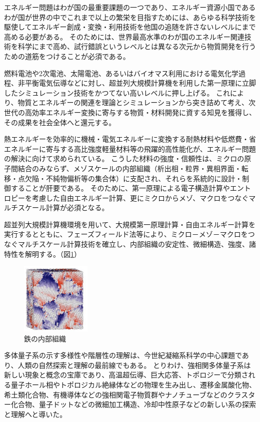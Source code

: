 エネルギー問題はわが国の最重要課題の一つであり、エネルギー資源小国であるわが国が世界の中でこれまで以上の繁栄を目指すためには、あらゆる科学技術を駆使してエネルギー創成・変換・利用技術を他国の追随を許さないレベルにまで高める必要がある。
そのためには、世界最高水準のわが国のエネルギー関連技術を科学にまで高め、試行錯誤というレベルとは異なる次元から物質開発を行うための道筋をつけることが必須である。

燃料電池や2次電池、太陽電池、あるいはバイオマス利用における電気化学過程、非平衡電気伝導などに対し、超並列大規模計算機を利用した第一原理に立脚したシミュレーション技術をかつてない高いレベルに押し上げる。
これにより、物質とエネルギーの関連を理論とシミュレーションから突き詰めて考え、次世代の高効率エネルギー変換に寄与する物質・材料開発に資する知見を獲得し、その成果を社会全体へと還元する。

熱エネルギーを効率的に機械・電気エネルギーに変換する耐熱材料や低燃費・省エネルギーに寄与する高比強度軽量材料等の飛躍的高性能化が、エネルギー問題の解決に向けて求められている。
こうした材料の強度・信頼性は、ミクロの原子間結合のみならず、メゾスケールの内部組織（析出相・粒界・異相界面・転移・点欠陥・不純物偏析等の集合体）に支配され、それらを系統的に設計・制御することが肝要である。
そのために、第一原理による電子構造計算やエントロピーを考慮した自由エネルギー計算、更にミクロからメゾ、マクロをつなぐマルチスケール計算が必須となる。

超並列大規模計算機環境を用いて、大規模第一原理計算・自由エネルギー計算を実行するとともに、フェーズフィールド法等により、ミクロ－メゾ－マクロをつなぐマルチスケール計算技術を確立し、内部組織の安定性、微細構造、強度、諸特性を解明する。（図\ref{fig:4-2_1}）

\begin{figure}[H]
  \centering
  \includegraphics[width=0.3\textwidth]{figs/4-2_1.pdf}
  \caption{鉄の内部組織}
  \label{fig:4-2_1}
\end{figure}


多体量子系の示す多様性や階層性の理解は、今世紀凝縮系科学の中心課題であり、人類の自然探索と理解の最前線でもある。
とりわけ、強相関多体量子系は新しい現象と概念の宝庫であり、高温超伝導、巨大応答、トポロジーで分類される量子ホール相やトポロジカル絶縁体などの物理を生み出し、遷移金属酸化物、希土類化合物、有機導体などの強相関電子物質群やナノチューブなどのクラスター化合物、量子ドットなどの微細加工構造、冷却中性原子などの新しい系の探索と理解へと導いた。

